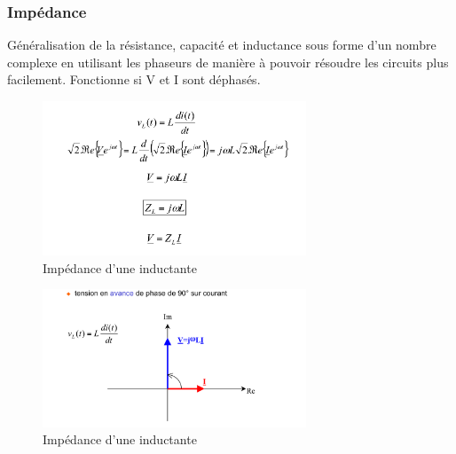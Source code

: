 \documentclass[a4paper]{article}
\begin{document}
        \subsubsection{Impédance}
            Généralisation de la résistance, capacité et inductance sous forme d'un nombre complexe en utilisant les phaseurs de manière à pouvoir résoudre les circuits plus facilement.
            Fonctionne si V et I sont déphasés.

            
            \begin{figure}[H]
                \begin{center}
                    \includegraphics[width=0.7\textwidth]{fig/2_impedance_L1.png}
                    \caption{Impédance d'une inductante}
                    \label{fig:2_superposition}
                \end{center}
            \end{figure}
            
            \begin{figure}[H]
                \begin{center}
                    \includegraphics[width=0.7\textwidth]{fig/2_impedance_L2.png}
                    \caption{Impédance d'une inductante}
                    \label{fig:2_superposition}
                \end{center}
            \end{figure}
\end{document}
